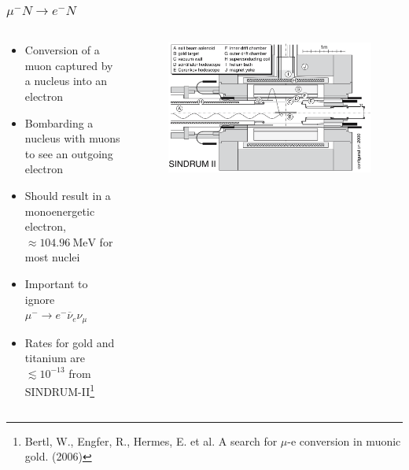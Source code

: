\documentclass[11pt]{beamer}
\begin{document}
\begin{frame}
    \frametitle{$\mu^- N \rightarrow e^- N$}

    \begin{columns}[c]
        \begin{column}{0.6\textwidth}
            \begin{itemize}
                \item Conversion of a muon captured by a nucleus into an electron
                \item Bombarding a nucleus with muons to see an outgoing electron
                \item Should result in a monoenergetic electron, $\approx\SI{104.96}{\mega\electronvolt}$ for most nuclei
                \item Important to ignore $\mu^-\rightarrow e^- \overline{\nu}_e \nu_\mu$
                \item Rates for gold and titanium are $\lesssim 10^{-13}$ from SINDRUM-II\footnote[frame]{Bertl, W., Engfer, R., Hermes, E. et al. A search for $\mu$-e conversion in muonic gold. (2006)}
            \end{itemize}
        \end{column}
        \begin{column}{0.4\textwidth}
            \begin{figure}[h]
                \begin{center}
                    \includegraphics[width=\textwidth]{SINDRUMII.png}
                \end{center}
            \end{figure}
        \end{column}
    \end{columns}
    

\end{frame}
\end{document}
